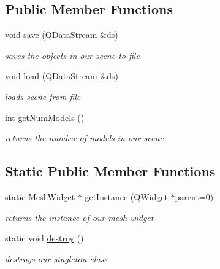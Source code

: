 \subsection*{Public Member Functions}
\begin{DoxyCompactItemize}
\item 
void \hyperlink{class_mesh_widget_a67ebdf43ebd7ada4ef14d0c72f6a2f35}{save} (Q\-Data\-Stream \&ds)
\begin{DoxyCompactList}\small\item\em saves the objects in our scene to file \end{DoxyCompactList}\item 
void \hyperlink{class_mesh_widget_a47bdbf5350b44dd43a08e27b16c407d7}{load} (Q\-Data\-Stream \&ds)
\begin{DoxyCompactList}\small\item\em loads scene from file \end{DoxyCompactList}\item 
\hypertarget{class_mesh_widget_a456ac85d510b5700f60877a5466d0311}{int \hyperlink{class_mesh_widget_a456ac85d510b5700f60877a5466d0311}{get\-Num\-Models} ()}\label{class_mesh_widget_a456ac85d510b5700f60877a5466d0311}

\begin{DoxyCompactList}\small\item\em returns the number of models in our scene \end{DoxyCompactList}\end{DoxyCompactItemize}
\subsection*{Static Public Member Functions}
\begin{DoxyCompactItemize}
\item 
\hypertarget{class_mesh_widget_ab69e785150bd1802124a3fea62940866}{static \hyperlink{class_mesh_widget}{Mesh\-Widget} $\ast$ \hyperlink{class_mesh_widget_ab69e785150bd1802124a3fea62940866}{get\-Instance} (Q\-Widget $\ast$parent=0)}\label{class_mesh_widget_ab69e785150bd1802124a3fea62940866}

\begin{DoxyCompactList}\small\item\em returns the instance of our mesh widget \end{DoxyCompactList}\item 
\hypertarget{class_mesh_widget_a39971ebf92a18d4d2a975fcefab82c91}{static void \hyperlink{class_mesh_widget_a39971ebf92a18d4d2a975fcefab82c91}{destroy} ()}\label{class_mesh_widget_a39971ebf92a18d4d2a975fcefab82c91}

\begin{DoxyCompactList}\small\item\em destroys our singleton class \end{DoxyCompactList}\end{DoxyCompactItemize}
